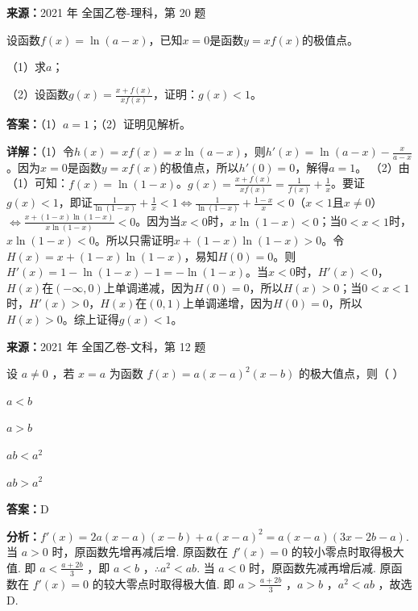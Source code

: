 \begin{question}[points=12]
\textbf{来源：}2021 年 全国乙卷-理科，第 20 题\par
设函数$f(x)=\ln(a-x)$，已知$x=0$是函数$y=xf(x)$的极值点。

（1）求$a$；

（2）设函数$g(x)=\frac{x+f(x)}{xf(x)}$，证明：$g(x)<1$。
\begin{solution}
\textbf{答案：}（1）$a=1$；（2）证明见解析。

\textbf{详解：}（1）令$h(x)=xf(x)=x\ln(a-x)$，则$h'(x)=\ln(a-x)-\frac{x}{a-x}$。因为$x=0$是函数$y=xf(x)$的极值点，所以$h'(0)=0$，解得$a=1$。
（2）由（1）可知：$f(x)=\ln(1-x)$。$g(x)=\frac{x+f(x)}{xf(x)}=\frac{1}{f(x)}+\frac{1}{x}$。要证$g(x)<1$，即证$\frac{1}{\ln(1-x)}+\frac{1}{x}<1\Leftrightarrow\frac{1}{\ln(1-x)}+\frac{1-x}{x}<0$（$x<1$且$x\neq0$）$\Leftrightarrow\frac{x+(1-x)\ln(1-x)}{x\ln(1-x)}<0$。因为当$x<0$时，$x\ln(1-x)<0$；当$0<x<1$时，$x\ln(1-x)<0$。所以只需证明$x+(1-x)\ln(1-x)>0$。令$H(x)=x+(1-x)\ln(1-x)$，易知$H(0)=0$。则$H'(x)=1-\ln(1-x)-1=-\ln(1-x)$。当$x<0$时，$H'(x)<0$，$H(x)$在$(-\infty,0)$上单调递减，因为$H(0)=0$，所以$H(x)>0$；当$0<x<1$时，$H'(x)>0$，$H(x)$在$(0,1)$上单调递增，因为$H(0)=0$，所以$H(x)>0$。综上证得$g(x)<1$。
\end{solution}
\end{question}

\begin{question}[points=5]
\textbf{来源：}2021 年 全国乙卷-文科，第 12 题\par
设 $a \neq 0$ ，若 $x = a$ 为函数 $f(x) = a(x-a)^2(x-b)$ 的极大值点，则（ ）
\begin{choices}
  \item $a < b$
  \item $a > b$
  \item $ab < a^2$
  \item $ab > a^2$
\end{choices}
\begin{solution}
\textbf{答案：}D

\textbf{分析：}$f'(x) = 2a(x-a)(x-b) + a(x-a)^2 = a(x-a)(3x-2b-a)$.
当 $a > 0$ 时，原函数先增再减后增.
原函数在 $f'(x)=0$ 的较小零点时取得极大值.
即 $a < \frac{a+2b}{3}$ ，即 $a < b$ ，$\therefore a^2 < ab$.
当 $a < 0$ 时，原函数先减再增后减.
原函数在 $f'(x)=0$ 的较大零点时取得极大值.
即 $a > \frac{a+2b}{3}$ ，$a > b$ ，$a^2 < ab$ ，故选 D.
\end{solution}
\end{question}

